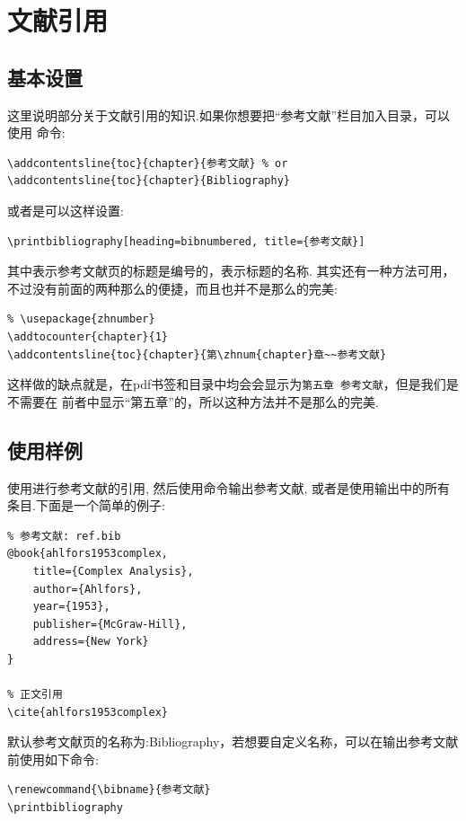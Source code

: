\section{文献引用}
\subsection{基本设置}
这里说明部分关于文献引用的知识.如果你想要把``参考文献''栏目加入目录，可以使用
命令\cite{ahlfors1953complex}:

\begin{verbatim}
\addcontentsline{toc}{chapter}{参考文献} % or
\addcontentsline{toc}{chapter}{Bibliography}
\end{verbatim}

或者是可以这样设置:
\begin{verbatim}
\printbibliography[heading=bibnumbered, title={参考文献}]
\end{verbatim}

其中表示参考文献页的标题是编号的，表示标题的名称.
其实还有一种方法可用，不过没有前面的两种那么的便捷，而且也并不是那么的完美:
\begin{verbatim}
% \usepackage{zhnumber}
\addtocounter{chapter}{1}
\addcontentsline{toc}{chapter}{第\zhnum{chapter}章~~参考文献}
\end{verbatim}

这样做的缺点就是，在pdf书签和目录中均会会显示为\texttt{第五章  参考文献}，但是我们是不需要在
前者中显示``第五章''的，所以这种方法并不是那么的完美.

\subsection{使用样例}
使用进行参考文献的引用, 然后使用命令\cmd{\printbibliography}输出参考文献,
或者是使用\cmd{\nocite{*}}输出中的所有条目.下面是一个简单的例子:

\begin{verbatim}
% 参考文献: ref.bib
@book{ahlfors1953complex,
    title={Complex Analysis},
    author={Ahlfors},
    year={1953},
    publisher={McGraw-Hill},
    address={New York}
}

% 正文引用
\cite{ahlfors1953complex}
\end{verbatim}

默认参考文献页的名称为:Bibliography，若想要自定义名称，可以在输出参考文献前使用如下命令:
\begin{verbatim}
\renewcommand{\bibname}{参考文献}
\printbibliography
\end{verbatim}


